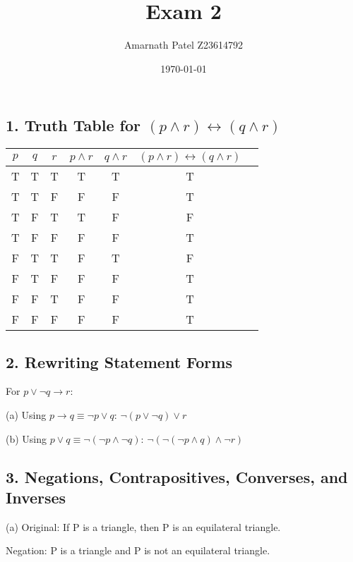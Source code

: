 \documentclass{article}
\begin{document}
\title{Exam 2}
\author{Amarnath Patel Z23614792}
\date{\today}

\maketitle

\subsection*{1. Truth Table for $(p \wedge r) \leftrightarrow (q \wedge r)$}

\begin{center}
\begin{tabular}{|c|c|c|c|c|c|c|}
\hline
$p$ & $q$ & $r$ & $p \wedge r$ & $q \wedge r$ & $(p \wedge r) \leftrightarrow (q \wedge r)$ \\
\hline
T & T & T & T & T & T \\
T & T & F & F & F & T \\
T & F & T & T & F & F \\
T & F & F & F & F & T \\
F & T & T & F & T & F \\
F & T & F & F & F & T \\
F & F & T & F & F & T \\
F & F & F & F & F & T \\
\hline
\end{tabular}
\end{center}

\subsection*{2. Rewriting Statement Forms}

For $p \vee \neg q \rightarrow r$:

(a) Using $p \rightarrow q \equiv \neg p \vee q$:
    $\neg(p \vee \neg q) \vee r$
    
(b) Using $p \vee q \equiv \neg(\neg p \wedge \neg q)$:
    $\neg(\neg(\neg p \wedge q) \wedge \neg r)$

\subsection*{3. Negations, Contrapositives, Converses, and Inverses}

(a) Original: If P is a triangle, then P is an equilateral triangle.
   
   Negation: P is a triangle and P is not an equilateral triangle.
   
\end{document}
